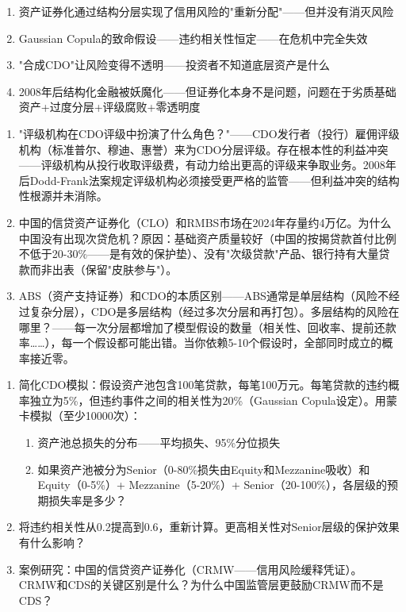 \documentclass[a4paper,11pt]{ctexbook}
\begin{document}
\begin{lessonsummary}
\begin{enumerate}
  \item 资产证券化通过结构分层实现了信用风险的"重新分配"——但并没有消灭风险
  \item Gaussian Copula的致命假设——违约相关性恒定——在危机中完全失效
  \item "合成CDO"让风险变得不透明——投资者不知道底层资产是什么
  \item 2008年后结构化金融被妖魔化——但证券化本身不是问题，问题在于劣质基础资产+过度分层+评级腐败+零透明度
\end{enumerate}
\end{lessonsummary}

\begin{discuss}
\begin{enumerate}
  \item "评级机构在CDO评级中扮演了什么角色？"——CDO发行者（投行）雇佣评级机构（标准普尔、穆迪、惠誉）来为CDO分层评级。存在根本性的利益冲突——评级机构从投行收取评级费，有动力给出更高的评级来争取业务。2008年后Dodd-Frank法案规定评级机构必须接受更严格的监管——但利益冲突的结构性根源并未消除。
  \item 中国的信贷资产证券化（CLO）和RMBS市场在2024年存量约4万亿。为什么中国没有出现次贷危机？原因：基础资产质量较好（中国的按揭贷款首付比例不低于20-30\%——是有效的保护垫）、没有"次级贷款"产品、银行持有大量贷款而非出表（保留"皮肤参与"）。
  \item ABS（资产支持证券）和CDO的本质区别——ABS通常是单层结构（风险不经过复杂分层），CDO是多层结构（经过多次分层和再打包）。多层结构的风险在哪里？——每一次分层都增加了模型假设的数量（相关性、回收率、提前还款率……），每一个假设都可能出错。当你依赖5-10个假设时，全部同时成立的概率接近零。
\end{enumerate}
\end{discuss}

\begin{exercises}
\begin{enumerate}
  \item 简化CDO模拟：假设资产池包含100笔贷款，每笔100万元。每笔贷款的违约概率独立为5\%，但违约事件之间的相关性为20\%（Gaussian Copula设定）。用蒙卡模拟（至少10000次）：
  \begin{enumerate}
    \item 资产池总损失的分布——平均损失、95\%分位损失
    \item 如果资产池被分为Senior（0-80\%损失由Equity和Mezzanine吸收）和Equity（0-5\%）+ Mezzanine（5-20\%）+ Senior（20-100\%），各层级的预期损失率是多少？
  \end{enumerate}
  \item 将违约相关性从0.2提高到0.6，重新计算。更高相关性对Senior层级的保护效果有什么影响？
  \item 案例研究：中国的信贷资产证券化（CRMW——信用风险缓释凭证）。CRMW和CDS的关键区别是什么？为什么中国监管层更鼓励CRMW而不是CDS？
\end{enumerate}
\end{exercises}
\end{document}
